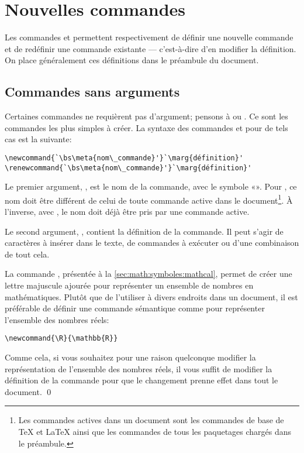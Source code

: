 \section{Nouvelles commandes}
\label{sec:commandes:commandes}

Les commandes \cmd{\newcommand} et \cmd{\renewcommand} permettent
respectivement de définir une nouvelle commande et de redéfinir une
commande existante --- c'est-à-dire d'en modifier la définition. On
place généralement ces définitions dans le préambule du document.

\subsection{Commandes sans arguments}
\label{sec:commandes:commandes:sans_arg}

Certaines commandes ne requièrent pas d'argument; pensons à
\cmdprint{\LaTeX} ou \cmdprint{\bfseries}. Ce sont les commandes les
plus simples à créer. La syntaxe des commandes \cmd{\newcommand} et
\cmd{\renewcommand} pour de tels cas est la suivante:
\begin{lstlisting}
\newcommand{`\bs\meta{nom\_commande}'}`\marg{définition}'
\renewcommand{`\bs\meta{nom\_commande}'}`\marg{définition}'
\end{lstlisting}
Le premier argument, \bs{}, est le nom de la
commande, avec le symbole «\bs». Pour \cmdprint{\newcommand}, ce nom
doit être différent de celui de toute commande active dans le
document\footnote{%
  Les commandes actives dans un document sont les commandes de base de
  {\TeX} et {\LaTeX} ainsi que les commandes de tous les paquetages
  chargés dans le préambule.}. %
À l'inverse, avec \cmdprint{\renewcommand}, le nom doit déjà être pris
par une commande active.

Le second argument, , contient la définition de la
commande. Il peut s'agir de caractères à insérer dans le texte, de
commandes à exécuter ou d'une combinaison de tout cela.

\begin{exemple}
  La commande \cmd{\mathbb}, présentée à la
  \autoref{sec:math:symboles:mathcal}, permet de créer une lettre
  majuscule ajourée pour représenter un ensemble de nombres en
  mathématiques. Plutôt que de l'utiliser à divers endroits dans un
  document, il est préférable de définir une commande sémantique comme
  \cmdprint{\R} pour représenter l'ensemble des nombres réels:
\begin{lstlisting}
\newcommand{\R}{\mathbb{R}}
\end{lstlisting}
  Comme cela, si vous souhaitez pour une raison quelconque modifier la
  représentation de l'ensemble des nombres réels, il vous suffit de
  modifier la définition de la commande \cmdprint{\R} pour que le
  changement prenne effet dans tout le document. %
  \qed
\end{exemple}

